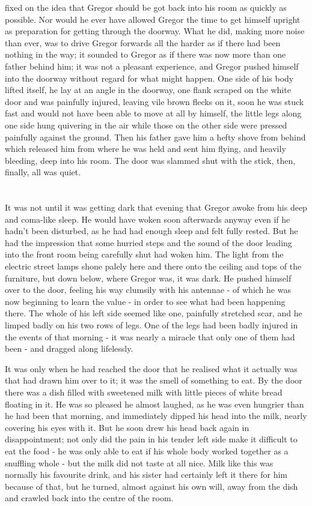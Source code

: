 \documentclass[12pt]{book}
\begin{document}
fixed on the idea that Gregor should be got back into his room as quickly as possible. Nor would he ever have allowed Gregor the time to get himself upright as preparation for getting through the doorway. What he did, making more noise than ever, was to drive Gregor forwards all the harder as if there had been nothing in the way; it sounded to Gregor as if there was now more than one father behind him; it was not a pleasant experience, and Gregor pushed himself into the doorway without regard for what might happen. One side of his body lifted itself, he lay at an angle in the doorway, one flank scraped on the white door and was painfully injured, leaving vile brown flecks on it, soon he was stuck fast and would not have been able to move at all by himself, the little legs along one side hung quivering in the air while those on the other side were pressed painfully against the ground. Then his father gave him a hefty shove from behind which released him from where he was held and sent him flying, and heavily bleeding, deep into his room. The door was slammed shut with the stick, then, finally, all was quiet.

    \chapter{}
    It was not until it was getting dark that evening that Gregor awoke from his deep and coma-like sleep. He would have woken soon afterwards anyway even if he hadn't been disturbed, as he had had enough sleep and felt fully rested. But he had the impression that some hurried steps and the sound of the door leading into the front room being carefully shut had woken him. The light from the electric street lamps shone palely here and there onto the ceiling and tops of the furniture, but down below, where Gregor was, it was dark. He pushed himself over to the door, feeling his way clumsily with his antennae - of which he was now beginning to learn the value - in order to see what had been happening there. The whole of his left side seemed like one, painfully stretched scar, and he limped badly on his two rows of legs. One of the legs had been badly injured in the events of that morning - it was nearly a miracle that only one of them had been - and dragged along lifelessly.

    It was only when he had reached the door that he realised what it actually was that had drawn him over to it; it was the smell of something to eat. By the door there was a dish filled with sweetened milk with little pieces of white bread floating in it. He was so pleased he almost laughed, as he was even hungrier than he had been that morning, and immediately dipped his head into the milk, nearly covering his eyes with it. But he soon drew his head back again in disappointment; not only did the pain in his tender left side make it difficult to eat the food - he was only able to eat if his whole body worked together as a snuffling whole - but the milk did not taste at all nice. Milk like this was normally his favourite drink, and his sister had certainly left it there for him because of that, but he turned, almost against his own will, away from the dish and crawled back into the centre of the room.
\end{document}
